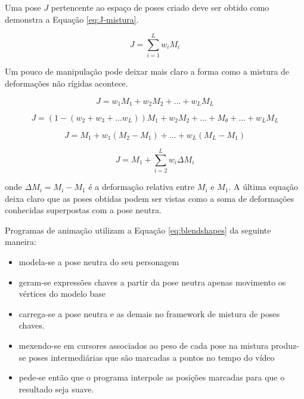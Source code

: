 {    Uma pose $J$ pertencente ao espaço de poses criado deve ser obtido como demonstra a Equação \ref{eq:J-mistura}.
    

\begin{equation}
    	J = \sum_{i=1}^L  w_i M_i
        \label{eq:J-mistura}
\end{equation}

Um pouco de manipulação pode deixar mais claro a forma como a mistura de deformações não rígidas acontece.

\begin{equation}
    	J = w_1 M_1 + w_2 M_2 + \ldots + w_L M_L
\end{equation}

\begin{equation}
    	J = (1-(w_2 + w_3 + \ldots w_L)) M_1 + w_2 M_2 + \ldots + M_\theta + \ldots + w_L M_L
\end{equation}

\begin{equation}
    	J = M_1 + w_1(M_2 - M_1) + \ldots + w_L (M_L - M_1)
\end{equation}

\begin{equation}
    	J = M_1 + \sum_{i = 2}^L w_i \Delta M_i
        \label{eq:blendshapes}
\end{equation}

onde $\Delta M_i = M_i - M_1$ é a deformação relativa entre $M_i$ e $M_1$. A última equação deixa claro que as poses obtidas podem ser vistas como a soma de deformações conhecidas superpostas com a pose neutra. 

Programas de animação utilizam a Equação \ref{eq:blendshapes} da seguinte maneira: 
\begin{itemize}

	\item modela-se a pose neutra do seu personagem 
    \item geram-se expressões chaves a partir da pose neutra apenas movimento os vértices do modelo base
    \item carrega-se a pose neutra e as demais no framework de mistura de poses chaves.
    \item mexendo-se em cursores associados ao peso de cada pose na mistura produz-se  poses intermediárias que são marcadas a pontos no tempo do vídeo
    \item pede-se então que o programa interpole as posições marcadas para que o resultado seja suave.
\end{itemize}

}
